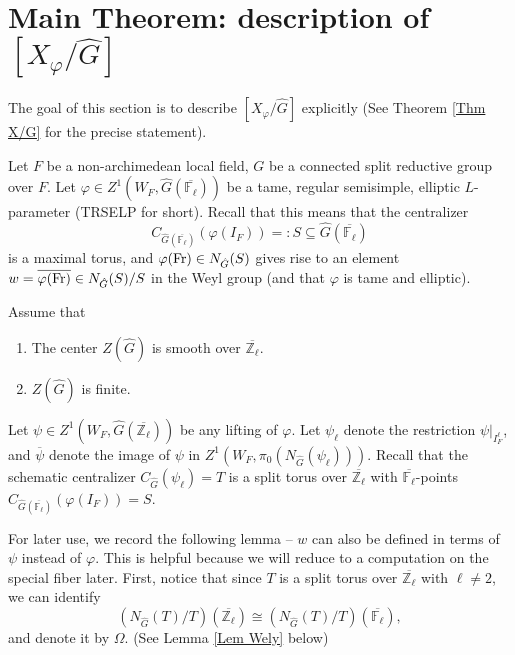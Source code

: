 \section{Main Theorem: description of $[X_{\varphi}/\hat{G}]$}\label{Section X/hatG}

The goal of this section is to describe $[X_{\varphi}/\hat{G}]$ explicitly (See Theorem \ref{Thm X/G} for the precise statement).

Let $F$ be a non-archimedean local field, $G$ be a connected split reductive group over $F$. Let $\varphi \in Z^1(W_F, \hat{G}(\overline{\mathbb{F}_{\ell}}))$ be a tame, regular semisimple, elliptic $L$-parameter (TRSELP for short). Recall that this means that the centralizer 
$$C_{\hat{G}(\overline{\mathbb{F}_{\ell}})}(\varphi(I_F)) =: S \subseteq \hat{G}(\overline{\mathbb{F}_{\ell}})$$ 
is a maximal torus, and $\varphi(\operatorname{Fr}) \in N_{\hat{G}}(S)$ gives rise to an element $w=\overline{\varphi(\operatorname{Fr})} \in N_{\hat{G}}(S)/S$ in the Weyl group (and that $\varphi$ is tame and elliptic). 

Assume that 
\begin{enumerate}
	\item \label{assumption 1} The center $Z(\hat{G})$ is smooth over $\overline{\mathbb{Z}_{\ell}}$.
	\item \label{assumption 2} $Z(\hat{G})$ is finite.
\end{enumerate}

Let $\psi \in Z^1(W_F, \hat{G}(\overline{\mathbb{Z}_{\ell}}))$ be any lifting of $\varphi$. Let $\psi_{\ell}$ denote the restriction $\psi|_{I_F^{\ell}}$, and $\overline{\psi}$ denote the image of $\psi$ in $Z^1(W_F, \pi_0(N_{\hat{G}}(\psi_{\ell})))$. Recall that the schematic centralizer $C_{\hat{G}}(\psi_{\ell})=T$ is a split torus over $\overline{\mathbb{Z}_{\ell}}$ with $\overline{\mathbb{F}_{\ell}}$-points $C_{\hat{G}(\overline{\mathbb{F}_{\ell}})}(\varphi(I_F)) = S$. 

For later use, we record the following lemma -- $w$ can also be defined in terms of $\psi$ instead of $\varphi$. This is helpful because we will reduce to a computation on the special fiber later. First, notice that since $T$ is a split torus over $\overline{\mathbb{Z}_{\ell}}$ with $\ell \neq 2$, we can identify
$$\left(N_{\hat{G}}(T)/T\right)(\overline{\mathbb{Z}_{\ell}}) \cong \left(N_{\hat{G}}(T)/T\right)(\overline{\mathbb{F}_{\ell}}),$$
and denote it by $\Omega$. (See Lemma \ref{Lem Wely} below) 

